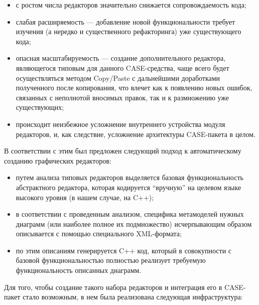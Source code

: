 \documentclass[a5paper]{article}
\begin{document}
\begin{itemize}
  \item с ростом числа редакторов значительно снижается сопровождаемость кода;
  \item слабая расширяемость --- добавление новой функциональности требует
        изучения (а нередко и существенного рефакторинга) уже существующего
        кода;
  \item опасная масштабируемость --- создание дополнительного редактора,
        являющегося типовым для данного CASE-средства, чаще всего будет
        осуществляться методом Copy/Paste с
        дальнейшими доработками полученного после копирования, что влечет как к
        появлению новых ошибок, связанных с неполнотой вносимых
        правок, так и к размножению уже существующих;
  \item происходит неизбежное усложнение внутреннего устройства модуля
        редакторов, и, как следствие, усложнение архитектуры
        CASE-пакета в целом.
\end{itemize}

В соответствии с этим был предложен следующий подход к автоматическому
созданию графических редакторов:

\begin{itemize}
  \item путем анализа типовых редакторов выделяется базовая функциональность
        абстрактного редактора, которая кодируется ``вручную'' на целевом языке
        высокого уровня (в нашем случае, на C++);
  \item в соответствии с проведенным анализом, специфика метамоделей нужных
        диаграмм (или наиболее полное их подмножество) исчерпывающим образом
        описывается с помощью специального XML-формата;
  \item по этим описаниям генерируется C++ код,
        который в совокупности с базовой функциональностью полностью реализует
        требуемую функциональность описанных диаграмм.
\end{itemize}

Для того, чтобы создание такого набора редакторов и интеграция его в
CASE-пакет стало возможным, в нем была реализована следующая инфраструктура:
\end{document}
